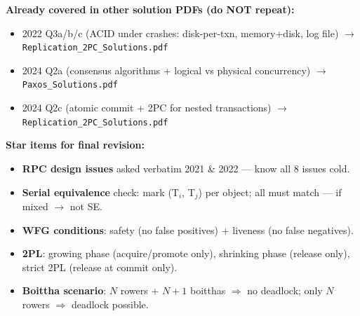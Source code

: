 \documentclass[11pt,a4paper]{article}
\begin{document}
\vspace{4pt}
\begin{mdframed}[backgroundcolor={green!8}, linecolor=notegreen, linewidth=1pt]
\textbf{Already covered in other solution PDFs (do NOT repeat):}
\begin{itemize}
  \item 2022 Q3a/b/c (ACID under crashes: disk-per-txn, memory+disk, log file) $\to$ \texttt{Replication\_2PC\_Solutions.pdf}
  \item 2024 Q2a (consensus algorithms + logical vs physical concurrency) $\to$ \texttt{Paxos\_Solutions.pdf}
  \item 2024 Q2c (atomic commit + 2PC for nested transactions) $\to$ \texttt{Replication\_2PC\_Solutions.pdf}
\end{itemize}

\textbf{Star items for final revision:}
\begin{itemize}
  \item \textbf{RPC design issues} asked verbatim 2021 \& 2022 --- know all 8 issues cold.
  \item \textbf{Serial equivalence} check: mark (T$_i$, T$_j$) per object; all must match --- if mixed $\to$ not SE.
  \item \textbf{WFG conditions}: safety (no false positives) + liveness (no false negatives).
  \item \textbf{2PL}: growing phase (acquire/promote only), shrinking phase (release only), strict 2PL (release at commit only).
  \item \textbf{Boittha scenario}: $N$ rowers + $N{+}1$ boitthas $\Rightarrow$ no deadlock; only $N$ rowers $\Rightarrow$ deadlock possible.
\end{itemize}
\end{mdframed}
\end{document}
